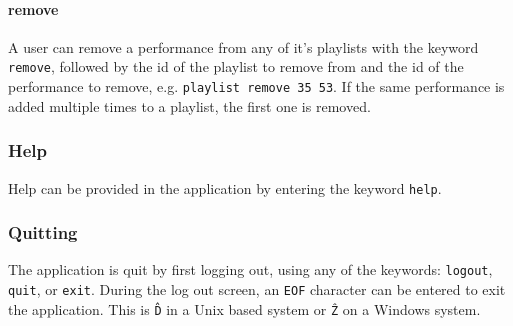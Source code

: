 \paragraph{remove}
A user can remove a performance from any of it's playlists with the keyword \texttt{remove}, followed
by the id of the playlist to remove from and the id of the performance to remove, e.g.
\texttt{playlist remove 35 53}. If the same performance is added multiple times to a playlist, the
first one is removed.

\subsubsection{Help}
Help can be provided in the application by entering the keyword \texttt{help}.

\subsubsection{Quitting}
The application is quit by first logging out, using any of the keywords: \texttt{logout}, \texttt{quit},
or \texttt{exit}. During the log out screen, an \texttt{EOF} character can be entered to exit the
application. This is \texttt{\^D} in a Unix based system or \texttt{\^Z} on a Windows system.


